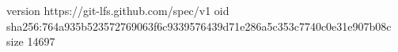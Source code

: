 version https://git-lfs.github.com/spec/v1
oid sha256:764a935b523572769063f6c9339576439d71e286a5c353c7740c0e31e907b08c
size 14697
